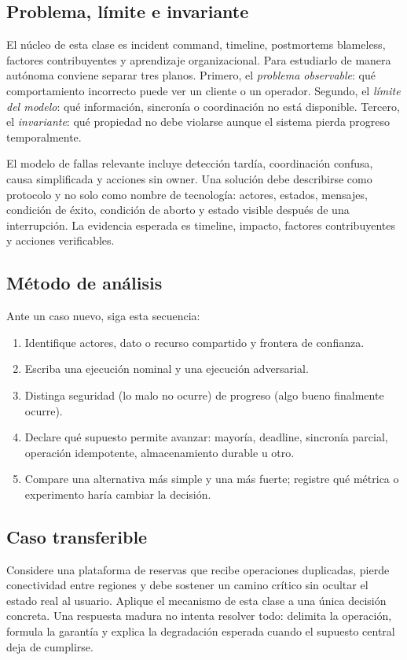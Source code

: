 \documentclass[variant=apuntes,cover=institutional,mode=screen]{ua-engineering-v6-article}
\begin{document}
\subsection{Problema, límite e invariante}
El núcleo de esta clase es incident command, timeline, postmortems blameless, factores contribuyentes y aprendizaje organizacional. Para estudiarlo de manera autónoma conviene separar tres planos. Primero, el \emph{problema observable}: qué comportamiento incorrecto puede ver un cliente o un operador. Segundo, el \emph{límite del modelo}: qué información, sincronía o coordinación no está disponible. Tercero, el \emph{invariante}: qué propiedad no debe violarse aunque el sistema pierda progreso temporalmente.

El modelo de fallas relevante incluye detección tardía, coordinación confusa, causa simplificada y acciones sin owner. Una solución debe describirse como protocolo y no solo como nombre de tecnología: actores, estados, mensajes, condición de éxito, condición de aborto y estado visible después de una interrupción. La evidencia esperada es timeline, impacto, factores contribuyentes y acciones verificables.

\subsection{Método de análisis}
Ante un caso nuevo, siga esta secuencia:
\begin{enumerate}
\item Identifique actores, dato o recurso compartido y frontera de confianza.
\item Escriba una ejecución nominal y una ejecución adversarial.
\item Distinga seguridad (lo malo no ocurre) de progreso (algo bueno finalmente ocurre).
\item Declare qué supuesto permite avanzar: mayoría, deadline, sincronía parcial, operación idempotente, almacenamiento durable u otro.
\item Compare una alternativa más simple y una más fuerte; registre qué métrica o experimento haría cambiar la decisión.
\end{enumerate}

\subsection{Caso transferible}
Considere una plataforma de reservas que recibe operaciones duplicadas, pierde conectividad entre regiones y debe sostener un camino crítico sin ocultar el estado real al usuario. Aplique el mecanismo de esta clase a una única decisión concreta. Una respuesta madura no intenta resolver todo: delimita la operación, formula la garantía y explica la degradación esperada cuando el supuesto central deja de cumplirse.
\end{document}
